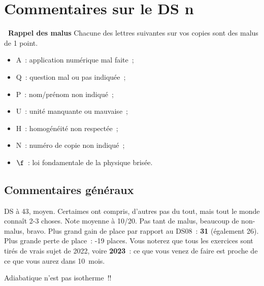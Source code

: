 \documentclass[a4paper, 11pt, final, garamond]{book}
\begin{document}
\setcounter{chapter}{8}

\chapter{Commentaires sur le DS n}

\begin{NCprop}[width=\linewidth]{\centering\bfseries\ Rappel des malus}
    Chacune des lettres suivantes sur vos copies sont des malus de \num{1}
    point.\smallbreak
    \begin{minipage}{0.50\linewidth}
        \begin{itemize}
            \item A~: application numérique mal faite~;
            \item Q~: question mal ou pas indiquée~;
            \item P~: nom/prénom non indiqué~;
        \end{itemize}
    \end{minipage}
    \begin{minipage}{0.50\linewidth}
        \begin{itemize}
            \item U~: unité manquante ou mauvaise~;
            \item H~: homogénéité non respectée~;
            \item N~: numéro de copie non indiqué~;
            \item $\f$~: loi fondamentale de la physique brisée.
        \end{itemize}
    \end{minipage}
\end{NCprop}

\section{Commentaires généraux}

DS à 43, moyen. Certaimes ont compris, d'autres pas du tout, mais tout le monde
connaît 2-3 choses. Note moyenne à 10/20. Pas tant de malus, beaucoup de
non-malus, bravo. Plus grand gain de place par rapport au DS08~: \textbf{31}
(également 26). Plus grande perte de place~: -19 places. Vous noterez que tous
les exercices sont tirés de vrais sujet de 2022, voire \textbf{2023}~: ce que
vous venez de faire est proche de ce que vous aurez dans \SI{10}{mois}.

\begin{center}
  \begin{framed}
    \huge
    Adiabatique n'est pas isotherme~!!
  \end{framed}
\end{center}
\end{document}
